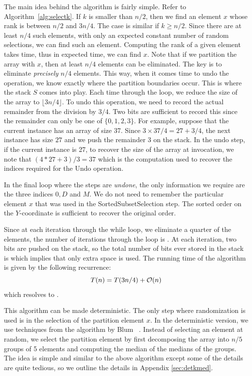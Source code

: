 The main idea behind the algorithm is fairly simple. Refer to
Algorithm~\ref{alg:selectk}. If $k$ is smaller than $n/2$, then we
find an element $x$ whose rank is between $n/2$ and $3n/4$. The case
is similar if $k \geq n/2$. Since there are at least $n/4$ such
elements, with only an expected constant number of random selections,
we can find such an element.  Computing the rank of a given element
takes  time, thus in  expected time, we can find $x$. Note
that if we partition the array with $x$, then at least $n/4$ elements
can be eliminated.  The key is to eliminate {\em precisely} $n/4$
elements. This way, when it comes time to undo the operation, we know
exactly where the partition boundaries occur. This is where the stack
$S$ comes into play.  Each time through the loop, we reduce the size
of the array to $\lfloor 3n/4 \rfloor$. To undo this operation, we
need to record the actual remainder from the division by $3/4$. Two
bits are sufficient to record this since the remainder can only be one
of $\{0, 1, 2, 3\}$.  For example, suppose that the current instance
has an array of size 37.  Since $3\times 37/4 = 27+3/4$, the next
instance has size $27$ and we push the remainder $3$ on the stack.  In
the undo step, if the current instance is 27, to recover the size of
the array at invocation, we note that $(4*27 + 3)/3 = 37$ which is the
computation used to recover the indices required for the Undo
operation.

In the final loop where the steps are {\em undone}, the only
information we require are the three indices $0, D$ and $M$. We do not
need to remember the particular element $x$ that was used in the SortedSubsetSelection step. 
The sorted order on the $Y$-coordinate
is sufficient to recover the original order. 

Since at each iteration through the while loop, we eliminate
a quarter of the elements, the number of iterations through the loop is . At
each iteration, two bits are pushed on the stack, so the total number of bits ever
stored in the stack is  which implies that only  extra space
is used. The running time of the algorithm is given by the following recurrence:
\[
T(n) = T(3n/4) + \mathcal{O}(n)
\] 
which resolves to .

This algorithm can be made  deterministic. The only step where randomization is used is in the selection 
of the partition element $x$. In the deterministic version, we use techniques from 
the algorithm by Blum \etal~\cite{blum:selection}.
Instead of selecting an element at random, we select the partition element by first decomposing the
array into $n/5$ groups of 5 elements and computing the median of the medians of the groups. 
The idea is simple and similar to the above algorithm except some of the details are quite tedious, so we outline the details
in Appendix \ref{sec:detkmed}.






